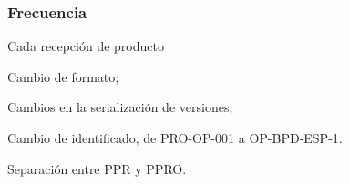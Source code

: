 \subsubsection{Frecuencia}

Cada recepción de producto



\begin{changelog}[simple, sectioncmd=\subsection*,label=changelog-1.2]
	\begin{version}[v=2.1, date=2023--01, author=Pablo E. Alanis]
			\item Cambio de formato;
			\item Cambios en la serialización de versiones;
			\item Cambio de identificado, de PRO-OP-001 a OP-BPD-ESP-1.
			\item Separación entre PPR y PPRO.
	\end{version}
\end{changelog}